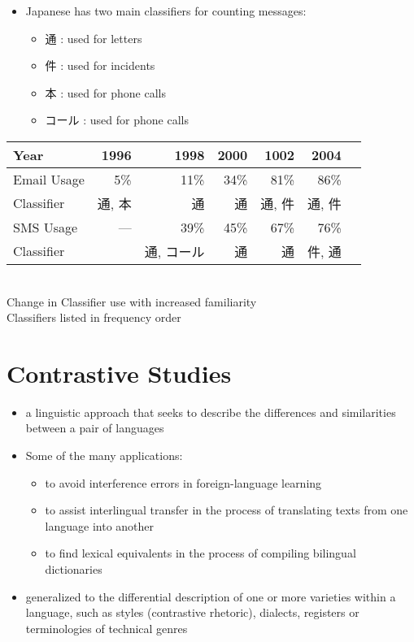 \documentclass[a4paper,landscape,headrule,footrule,dvips]{foils}
\begin{document}
\begin{CJK}{UTF8}{min}
\begin{itemize}
\item Japanese has two main classifiers for counting messages:
  \begin{itemize}
  \item 通 : used for letters
  \item 件 : used for incidents
  \item 本 : used for phone calls
  \item コール : used for phone calls
  \end{itemize}
\end{itemize}
\begin{center}
  \begin{tabular}{lrrrrrr}
    Year &  1996 & 1998 & 2000 & 1002 & 2004 \\ \hline
    Email Usage & 5\% & 11\% & 34\% & 81\% & 86\%\\
    Classifier  & 通, 本  & 通  & 通 & 通, 件 & 通, 件 \\
    SMS  Usage &   ---  & 39\% & 45\% & 67\% & 76\%\\
    Classifier  &  &  通, コール  & 通  & 通 & 件, 通 \\
  \end{tabular}
  \\[2ex] Change in Classifier use with increased familiarity
  \\ Classifiers listed in frequency order
\end{center}



\section{Contrastive Studies}
\MyLogo{}


\begin{itemize}
\item  a linguistic approach that seeks to describe the differences and similarities between a pair of languages
\item Some of the many applications:
  \begin{itemize}
  \item to avoid interference errors in foreign-language learning
  \item to assist interlingual transfer in the process of translating texts from one language into another
  \item to find lexical equivalents in the process of compiling bilingual dictionaries
  \end{itemize}
\item generalized to the differential description of one or more varieties within a language, such as styles (contrastive rhetoric), dialects, registers or terminologies of technical genres
\end{itemize}



\end{CJK}
\end{document}
